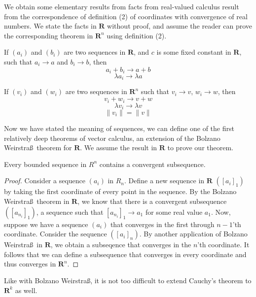 We obtain some elementary results from facts from real-valued calculus result from the correspondence of definition (2) of coordinates with convergence of real numbers. We state the facts in $\mathbf{R}$ without proof, and assume the reader can prove the corresponding theorem in $\mathbf{R}^n$ using definition (2).

\begin{theorem}
  If $(a_i)$ and $(b_i)$ are two sequences in $\mathbf{R}$, and $c$ is some fixed constant in $\mathbf{R}$, such that $a_i \to a$ and $ b_i \to b$, then
  \[ a_i + b_i \to a + b \]
  \[ \lambda a_i \to \lambda a \]
\end{theorem}

\begin{corollary}
  If $(v_i)$ and $(w_i)$ are two sequences in $\mathbf{R}^n$ such that $v_i \to v$, $w_i \to w$, then
  \[v_i + w_i \to v + w\]
  \[ \lambda v_i \to \lambda v \]
  \[ \| v_i \| = \| v \| \]
\end{corollary}

Now we have stated the meaning of sequences, we can define one of the first relatively deep theorems of vector calculus, an extension of the Bolzano Weirstra\ss\ theorem for $\mathbf{R}$. We assume the result in $\mathbf{R}$ to prove our theorem.

\begin{theorem}
  Every bounded sequence in $R^n$ contains a convergent subsequence.
\end{theorem}
\begin{proof}
  Consider a sequence $(a_i)$ in $R_n$. Define a new sequence in $\mathbf{R}$ $([a_i]_1)$ by taking the first coordinate of every point in the sequence. By the Bolzano Weirstra\ss\ theorem in $\mathbf{R}$, we know that there is a convergent subsequence $([a_{n_i}]_1)$, a sequence such that $[a_{n_i}]_1 \to a_1$ for some real value $a_1$. Now, suppose we have a sequence $(a_i)$ that converges in the first through $n-1$'th coordinate. Consider the sequence $([a_i]_n)$. By another application of Bolzano Weirstra\ss\ in $\mathbf{R}$, we obtain a subseqence that converges in the $n$'th coordinate. It follows that we can define a subsequence that converges in every coordinate and thus converges in $\mathbf{R}^n$.
\end{proof}

Like with Bolzano Weirstra\ss, it is not too difficult to extend Cauchy's theorem to $\mathbf{R}^k$ as well.

